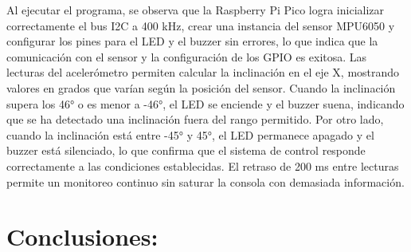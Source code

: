 \documentclass[letterpaper,12pt]{article}
\begin{document}
    Al ejecutar el programa, se observa que la Raspberry Pi Pico logra inicializar correctamente el bus I2C a 400 kHz, crear una instancia del sensor MPU6050 y configurar los pines para el LED y el buzzer sin errores, lo que indica que la comunicación con el sensor y la configuración de los GPIO es exitosa. Las lecturas del acelerómetro permiten calcular la inclinación en el eje X, mostrando valores en grados que varían según la posición del sensor. Cuando la inclinación supera los 46° o es menor a -46°, el LED se enciende y el buzzer suena, indicando que se ha detectado una inclinación fuera del rango permitido. Por otro lado, cuando la inclinación está entre -45° y 45°, el LED permanece apagado y el buzzer está silenciado, lo que confirma que el sistema de control responde correctamente a las condiciones establecidas. El retraso de 200 ms entre lecturas permite un monitoreo continuo sin saturar la consola con demasiada información.


    \newpage
    \section{Conclusiones:}
\end{document}
